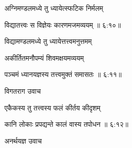 {\devanagarifont अग्निमण्डलमध्ये तु ध्यायेत्स्फटिक निर्मलम् \thinspace{\dandab} \dontdisplaylinenum }%


{\devanagarifont विद्यातत्त्वः स विज्ञेयः कारणमजमव्ययम् {॥ ६:१०॥} \veg\dontdisplaylinenum }%

{\devanagarifont विद्यामण्डलमध्ये तु ध्यायेत्तत्त्वमनुत्तमम् \thinspace{\dandab} \dontdisplaylinenum }%

{\devanagarifont अकीर्तितमनौपम्यं शिवमक्षयमव्ययम्  \danda\dontdisplaylinenum }%


{\devanagarifont पञ्चमं ध्यानयज्ञस्य तत्त्वमुक्तं समासतः {॥ ६:११॥} \veg\dontdisplaylinenum }%

{\devanagarifont विगतराग उवाच {\dandab}\dontdisplaylinenum  }%
 
{\devanagarifont एकैकस्य तु तत्त्वस्य फलं कीर्तय कीदृशम् \thinspace{\danda} \dontdisplaylinenum }%


{\devanagarifont कानि लोकाः प्रपद्यन्ते कालं वास्य तपोधन {॥ ६:१२॥} \veg\dontdisplaylinenum }%

{\devanagarifont अनर्थयज्ञ उवाच {\dandab}\dontdisplaylinenum  }%
 
